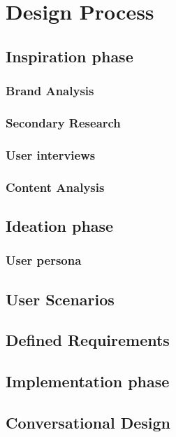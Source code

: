 \section{Design Process}

\vspace{5mm} %

\subsection{Inspiration phase}

    \subsubsection{Brand Analysis}
    \subsubsection{Secondary Research}
    \subsubsection{User interviews}
    \subsubsection{Content Analysis}

\subsection{Ideation phase}
    \subsubsection{User persona}
    \subsection{User Scenarios}
    \subsection{Defined Requirements}

\subsection{Implementation phase}
    \subsection{Conversational Design}
